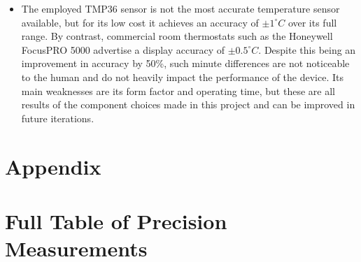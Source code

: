 \documentclass[10pt]{article}
\begin{document}
\begin{itemize}
	\item The employed TMP36 sensor is not the most accurate temperature sensor
	      available, but for its low cost it achieves an accuracy of $\pm 1^{\circ}C$
	      over its full range. By contrast, commercial room thermostats such as the
	      Honeywell FocusPRO 5000 advertise a display accuracy of $\pm 0.5^{\circ}C$.
	      Despite this being an improvement in accuracy by 50\%, such minute
	      differences are not noticeable to the human and do not heavily impact the
	      performance of the device. Its main weaknesses are its form factor and
	      operating time, but these are all results of the component choices made in
	      this project and can be improved in future iterations.
\end{itemize}


\pagebreak
\appendix

\section*{Appendix} \label{sec:appendix}

\section{Full Table of Precision Measurements} \label{sec:full_table}
\end{document}
